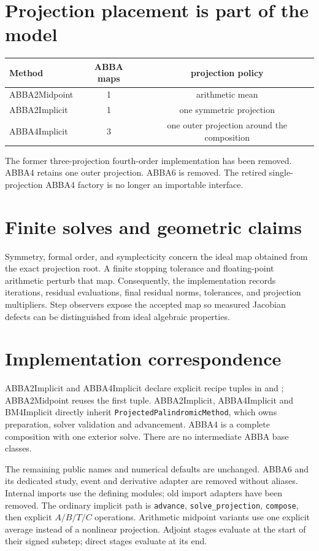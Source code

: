 \documentclass[11pt,a4paper]{article}
\begin{document}
\section{Projection placement is part of the model}

\begin{center}
\begin{tabular}{@{}lcc@{}}
\toprule
Method & ABBA maps & projection policy\\
\midrule
ABBA2Midpoint & 1 & arithmetic mean\\
ABBA2Implicit & 1 & one symmetric projection\\
ABBA4Implicit & 3 & one outer projection around the composition\\
\bottomrule
\end{tabular}
\end{center}
The former three-projection fourth-order implementation has been removed.
ABBA4 retains one outer projection. ABBA6 is removed. The retired
single-projection ABBA4 factory is no longer an importable interface.

\section{Finite solves and geometric claims}

Symmetry, formal order, and symplecticity concern the ideal map obtained from
the exact projection root.  A finite stopping tolerance and floating-point
arithmetic perturb that map.  Consequently, the implementation records
iterations, residual evaluations, final residual norms, tolerances, and
projection multipliers.  Step observers expose the accepted map so measured
Jacobian defects can be distinguished from ideal algebraic properties.

\section{Implementation correspondence}
ABBA2Implicit and ABBA4Implicit declare explicit recipe tuples in
 and
; ABBA2Midpoint reuses the first tuple.
ABBA2Implicit, ABBA4Implicit and BM4Implicit directly inherit
\texttt{ProjectedPalindromicMethod}, which owns preparation, solver validation
and advancement. ABBA4 is a complete composition with one exterior solve.
There are no intermediate ABBA base classes.

The remaining public names and numerical defaults are unchanged. ABBA6 and
its dedicated study, event and derivative adapter are removed without aliases. Internal imports use the defining modules; old import
adapters have been removed. The ordinary implicit path is \texttt{advance}, \texttt{solve\_projection},
\texttt{compose}, then explicit $A/B/T/C$ operations.
Arithmetic midpoint variants use one explicit average instead of a nonlinear
projection. Adjoint stages evaluate at the start of their signed substep;
direct stages evaluate at its end.
\end{document}
